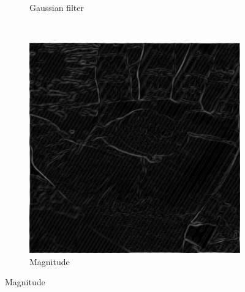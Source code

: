 \documentclass{article}
\begin{document}
\begin{enumerate}[label=(\alph*)]
\begin{figure}[!htb]
\begin{subfigure}[b]{0.3\textwidth}
            \caption{Gaussian filter}
        \end{subfigure}
        ~
        \begin{subfigure}[b]{0.3\textwidth}
            \includegraphics[width=\textwidth]{img/G(noise).png}
            \caption{Magnitude}
        \end{subfigure}
        


\end{figure}
\end{enumerate}
\end{document}
